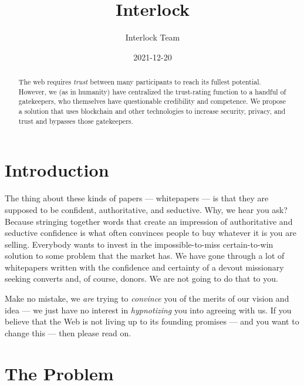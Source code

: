 \documentclass[a4paper]{article}
\date{2021-12-20}
\title{Interlock}
\author{Interlock Team}
\begin{document}
\maketitle
\tableofcontents

\pagebreak


\begin{abstract}
The web requires \emph{trust} between many participants to reach its
fullest potential. However, we (as in humanity) have centralized the
trust-rating function to a handful of gatekeepers, who themselves have
questionable credibility and competence. We propose a solution that uses
blockchain and other technologies to increase security, privacy, and
trust and bypasses those gatekeepers.
\end{abstract}

\section{Introduction}
The thing about these kinds of papers --- whitepapers --- is that they
are supposed to be confident, authoritative, and seductive. Why, we hear
you ask? Because stringing together words that create an impression of
authoritative and seductive confidence is what often convinces people to
buy whatever it is you are selling. Everybody wants to invest in the
impossible-to-miss certain-to-win solution to some problem that the
market has. We have gone through a lot of whitepapers written with the
confidence and certainty of a devout missionary seeking converts and, of
course, donors. We are not going to do that to you.

Make no mistake, we \emph{are} trying to \emph{convince} you of the
merits of our vision and idea --- we just have no interest in \emph{
hypnotizing} you into agreeing with us. If you believe that the Web is
not living up to its founding promises --- and you want to change this
--- then please read on.

\section{The Problem}
\end{document}
